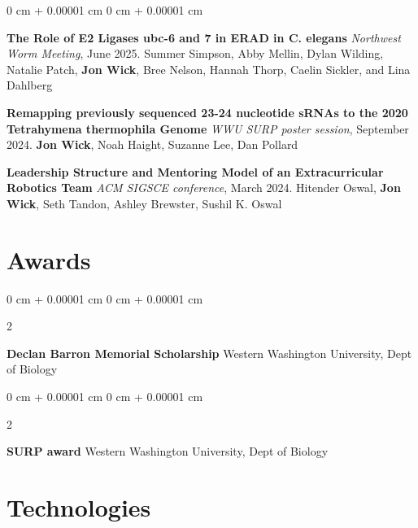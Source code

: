\documentclass[10pt, article]{article}
\newenvironment{onecolentry}{
    \begin{adjustwidth}{
        0 cm + 0.00001 cm
    }{
        0 cm + 0.00001 cm
    }
}{
    \end{adjustwidth}
} %
\newenvironment{twocolentry}[2][]{
    \onecolentry
    \def\secondColumn{#2}
    \setcolumnwidth{\fill, 4.5 cm}
    \begin{paracol}{2}
}{
    \switchcolumn \raggedleft \secondColumn
    \end{paracol}
    \endonecolentry
} %
\begin{document}
        \begin{onecolentry}
           \textbf{The Role of E2 Ligases ubc-6 and 7 in ERAD in C. elegans} \newline
          \textit{Northwest Worm Meeting}, June 2025.\newline
            Summer Simpson, Abby Mellin, Dylan Wilding, Natalie Patch, \textbf{Jon Wick}, Bree Nelson, Hannah Thorp, Caelin Sickler, and Lina Dahlberg
         
           \vspace{0.2cm}

          \textbf{Remapping previously sequenced 23-24 nucleotide sRNAs to the 2020 Tetrahymena thermophila Genome}\newline
          \textit{WWU SURP poster session}, September 2024. \newline
          \textbf{Jon Wick}, Noah Haight, Suzanne Lee, Dan Pollard

          \vspace{0.2cm}

          \textbf{Leadership Structure and Mentoring Model of an Extracurricular Robotics Team} \newline
          \textit{ACM SIGSCE conference}, March 2024.\newline
          Hitender Oswal, \textbf{Jon Wick}, Seth Tandon, Ashley Brewster, Sushil K. Oswal



        \end{onecolentry}

    \section{Awards}
    \begin{twocolentry}
      {2025}
      \textbf{Declan Barron Memorial Scholarship} \newline
      Western Washington University, Dept of Biology
    \end{twocolentry}
    \begin{twocolentry}
      {2025}
      \textbf{SURP award} \newline
      Western Washington University, Dept of Biology
    \end{twocolentry}


    \section{Technologies}
\end{document}
